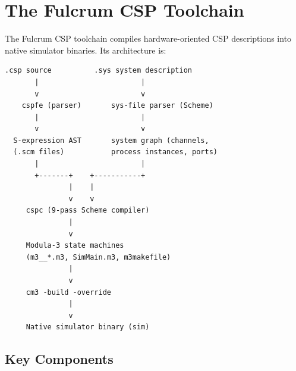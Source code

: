 \documentclass[11pt]{article}
\begin{document}
\section{The Fulcrum CSP Toolchain}

The Fulcrum CSP toolchain compiles hardware-oriented CSP descriptions
into native simulator binaries.  Its architecture is:

\begin{Verbatim}[samepage=true]
  .csp source          .sys system description
       |                        |
       v                        v
    cspfe (parser)       sys-file parser (Scheme)
       |                        |
       v                        v
  S-expression AST       system graph (channels,
  (.scm files)           process instances, ports)
       |                        |
       +-------+    +-----------+
               |    |
               v    v
     cspc (9-pass Scheme compiler)
               |
               v
     Modula-3 state machines
     (m3__*.m3, SimMain.m3, m3makefile)
               |
               v
     cm3 -build -override
               |
               v
     Native simulator binary (sim)
\end{Verbatim}

\subsection{Key Components}
\end{document}

